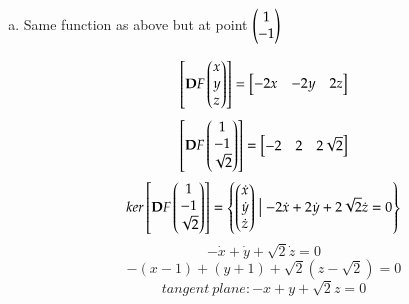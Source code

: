 \begin{enumerate}[a.]
  \item Same function as above but at point $\begin{pmatrix} 1 \\ -1 \end{pmatrix}$

  \[\begin{bmatrix} \textbf{D}F\begin{pmatrix} x \\ y \\ z \end{pmatrix} \end{bmatrix}=\begin{bmatrix} -2x & -2y & 2z \end{bmatrix}\]
  \[\begin{bmatrix} \textbf{D}F\begin{pmatrix} 1 \\ -1 \\ \sqrt{2} \end{pmatrix} \end{bmatrix}=\begin{bmatrix} -2 & 2 & 2\sqrt{2} \end{bmatrix}\]
  \[ker \begin{bmatrix} \textbf{D}F\begin{pmatrix} 1 \\ -1 \\ \sqrt{2} \end{pmatrix} \end{bmatrix}=\left\{ \begin{pmatrix} \dot{x} \\ \dot{y} \\ \dot{z} \end{pmatrix} \bigm| -2\dot{x} +2\dot{y} +2\sqrt{2}\dot{z}=0 \right\}\]
  \[-\dot{x}+\dot{y}+\sqrt{2}\dot{z}=0\]
  \[-(x-1)+(y+1)+\sqrt{2}(z-\sqrt{2})=0\]
  \[tangent\ plane : -x + y + \sqrt{2}z = 0\]

\end{enumerate}
